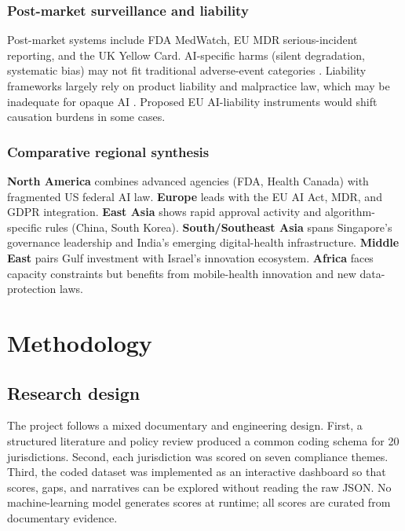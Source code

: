 \documentclass[12pt,a4paper]{report}
\begin{document}
\subsection{Post-market surveillance and liability}

Post-market systems include FDA MedWatch, EU MDR serious-incident reporting, and the UK Yellow Card. AI-specific harms (silent degradation, systematic bias) may not fit traditional adverse-event categories \cite{petersen2022}. Liability frameworks largely rely on product liability and malpractice law, which may be inadequate for opaque AI \cite{price2019}. Proposed EU AI-liability instruments would shift causation burdens in some cases.

\subsection{Comparative regional synthesis}

\textbf{North America} combines advanced agencies (FDA, Health Canada) with fragmented US federal AI law. \textbf{Europe} leads with the EU AI Act, MDR, and GDPR integration. \textbf{East Asia} shows rapid approval activity and algorithm-specific rules (China, South Korea). \textbf{South/Southeast Asia} spans Singapore's governance leadership and India's emerging digital-health infrastructure. \textbf{Middle East} pairs Gulf investment with Israel's innovation ecosystem. \textbf{Africa} faces capacity constraints but benefits from mobile-health innovation and new data-protection laws.

\chapter{Methodology}
\label{ch:method}

\section{Research design}

The project follows a mixed documentary and engineering design. First, a structured literature and policy review produced a common coding schema for 20 jurisdictions. Second, each jurisdiction was scored on seven compliance themes. Third, the coded dataset was implemented as an interactive dashboard so that scores, gaps, and narratives can be explored without reading the raw JSON. No machine-learning model generates scores at runtime; all scores are curated from documentary evidence.
\end{document}
